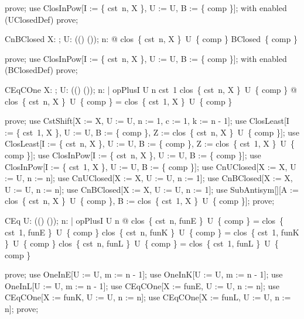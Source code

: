\documentclass{article}
\begin{document}
\begin{zproof}
prove;
use ClosInPow[I := \{ cst~n, X \}, U := U, B := \{ comp \}];
with enabled (UClosedDef) prove;
\end{zproof}

\begin{theorem}{CnBClosed}
  \forall X: \nat \fun \nat; U: \power ((\nat \fun \nat) \fun (\nat \fun \nat)); n: \nat @ clos~\{ cst~n, X \}~U~\{ comp \} \in BClosed~\{ comp \}
\end{theorem}

\begin{zproof}
prove;
use ClosInPow[I := \{ cst~n, X \}, U := U, B := \{ comp \}];
with enabled (BClosedDef) prove;
\end{zproof}

\begin{theorem}{CEqCOne}
  \forall X: \nat \fun \nat; U: \power ((\nat \fun \nat) \fun (\nat \fun \nat)); n: \nat | opPlusI \in U  \leq n \land cst~1 \in clos~\{ cst~n, X \}~U~\{ comp \} @ clos~\{ cst~n, X \}~U~\{ comp \} = clos~\{ cst~1, X \}~U~\{ comp \}
\end{theorem}

\begin{zproof}
prove;
use CstShift[X := X, U := U, n := 1, c := 1, k := n - 1];
use ClosLeast[I := \{ cst~1, X \}, U := U, B := \{ comp \}, Z := clos~\{ cst~n, X \}~U~\{ comp \}];
use ClosLeast[I := \{ cst~n, X \}, U := U, B := \{ comp \}, Z := clos~\{ cst~1, X \}~U~\{ comp \}];
use ClosInPow[I := \{ cst~n, X \}, U := U, B := \{ comp \}];
use ClosInPow[I := \{ cst~1, X \}, U := U, B := \{ comp \}];
use CnUClosed[X := X, U := U, n := n];
use CnUClosed[X := X, U := U, n := 1];
use CnBClosed[X := X, U := U, n := n];
use CnBClosed[X := X, U := U, n := 1];
use SubAntisym[\nat \fun \nat][A := clos~\{ cst~n, X \}~U~\{ comp \}, B := clos~\{ cst~1, X \}~U~\{ comp \}];
prove;
\end{zproof}

\begin{theorem}{CEq}
  \forall U: \power ((\nat \fun \nat) \fun (\nat \fun \nat)); n: \nat | opPlusI \in U  \leq n @ clos~\{ cst~n, funE \}~U~\{ comp \} = clos~\{ cst~1, funE \}~U~\{ comp \} \land clos~\{ cst~n, funK \}~U~\{ comp \} = clos~\{ cst~1, funK \}~U~\{ comp \} \land clos~\{ cst~n, funL \}~U~\{ comp \} = clos~\{ cst~1, funL \}~U~\{ comp \}
\end{theorem}

\begin{zproof}
prove;
use OneInE[U := U, m := n - 1];
use OneInK[U := U, m := n - 1];
use OneInL[U := U, m := n - 1];
use CEqCOne[X := funE, U := U, n := n];
use CEqCOne[X := funK, U := U, n := n];
use CEqCOne[X := funL, U := U, n := n];
prove;
\end{zproof}
\end{document}
